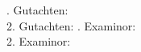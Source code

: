 \thispagestyle{empty}

\begin{titlepage}


\vspace*{4cm}


\begin{center}
\Large
\textbf{\titel}\\
\vspace*{1cm}
\name\\
\vspace*{1cm}
\normalsize
\art\\	
\nummer\\
\abgabemonat~\abgabejahr
\end{center}

\vspace*{4cm}

. Gutachten: \professor\\
2. Gutachten: \secondexaminor
{}. Examinor: \professor\\
2. Examinor: \secondexaminor
\fi


\end{titlepage}